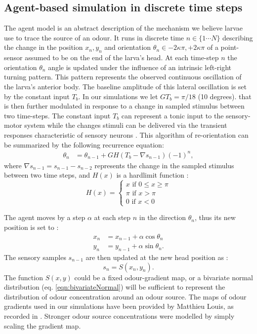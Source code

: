 \documentclass[10pt,a4paper]{article}
\begin{document}
\subsection{Agent-based simulation in discrete time steps}
\label{sec:methodsDiscreteAgent}
The agent model is an abstract description of the mechanism we believe larvae use to trace the source of an odour. It runs in discrete time $n \in \{1 \cdots N\}$ describing the change in the position $x_n,y_n$ and orientation $\theta_n \in {-2 \kappa \pi,+2 \kappa \pi}$ of a point-sensor assumed to be on the end of the larva's head. At each time-step $n$ the orientation $\theta_n$ angle is updated under the influence of an intrinsic left-right turning pattern. This pattern represents the observed continuous oscillation of the larva's anterior body. The baseline amplitude of this lateral oscillation is set by the constant input $T_b$. In our simulations we let $G T_b = \pi/18$ (10 degrees). that is then further modulated in response to a change in sampled stimulus between two time-steps. The constant input $T_b$ can represent a tonic input to the sensory-motor system while the changes stimuli can be delivered via the transient responses characteristic of sensory neurons \citep{nagel2011biophysical}.
 This algorithm of re-orientation can be summarized by the following recurrence equation:
\begin{align}
\theta_n &= \theta_{n-1} + G H(T_b - \nabla s_{n-1}){(-1)}^n,
\label{eqn:Discretemodel}
\end{align}
where  $\nabla s_{n-1}  = s_{n-1} - s_{n-2}$ represents the change in the sampled stimulus between two time steps, and $H(x)$ is a hardlimit function :
\begin{equation}
H(x) =
\begin{cases}
x \mbox{ if } 0 \leq x \geq \pi \\
\pi \mbox{ if } x > \pi  \\
0 \mbox{ if } x < 0 
\end{cases}
\end{equation}

The agent moves by a step $\alpha$ at each step $n$ in the direction $\theta_n$, thus its new position is set to :
\begin{align}
x_n &= x_{n-1}+ \alpha \cos \theta_{n} \\
y_n &= y_{n-1}+ \alpha  \sin \theta_{n}.
\end{align}
The sensory samples $s_{n-1}$ are then updated at the new head position as :
\begin{equation}
s_n = S(x_n,y_n).
\end{equation}
The function $S(x,y)$ could be a  fixed odour-gradient map, or a bivariate normal distribution (eq. \eqref{eqn:bivariateNormal}) will be sufficient to represent the distribution of odour concentration around an odour source. 
 The maps of odour gradients used in our simulations have been provided by Matthieu Louis, as recorded in \citep{gomez2014multilevel}. Stronger odour source concentrations were modelled by simply scaling the gradient map. 
\end{document}
